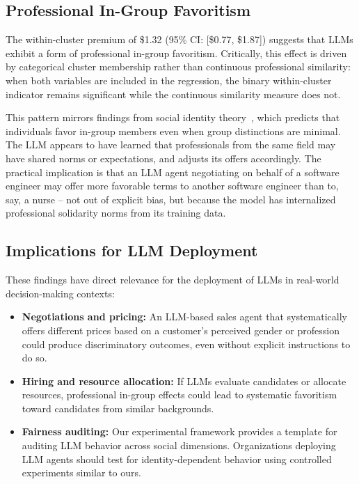 \documentclass[12pt]{article}
\begin{document}
\subsection{Professional In-Group Favoritism}

The within-cluster premium of \$1.32 (95\% CI: [\$0.77, \$1.87]) suggests that LLMs exhibit a form of professional in-group favoritism. Critically, this effect is driven by categorical cluster membership rather than continuous professional similarity: when both variables are included in the regression, the binary within-cluster indicator remains significant while the continuous similarity measure does not.

This pattern mirrors findings from social identity theory~\cite{tajfel1979}, which predicts that individuals favor in-group members even when group distinctions are minimal. The LLM appears to have learned that professionals from the same field may have shared norms or expectations, and adjusts its offers accordingly. The practical implication is that an LLM agent negotiating on behalf of a software engineer may offer more favorable terms to another software engineer than to, say, a nurse -- not out of explicit bias, but because the model has internalized professional solidarity norms from its training data.

\subsection{Implications for LLM Deployment}

These findings have direct relevance for the deployment of LLMs in real-world decision-making contexts:

\begin{itemize}
    \item \textbf{Negotiations and pricing:} An LLM-based sales agent that systematically offers different prices based on a customer's perceived gender or profession could produce discriminatory outcomes, even without explicit instructions to do so.
    \item \textbf{Hiring and resource allocation:} If LLMs evaluate candidates or allocate resources, professional in-group effects could lead to systematic favoritism toward candidates from similar backgrounds.
    \item \textbf{Fairness auditing:} Our experimental framework provides a template for auditing LLM behavior across social dimensions. Organizations deploying LLM agents should test for identity-dependent behavior using controlled experiments similar to ours.
\end{itemize}
\end{document}
